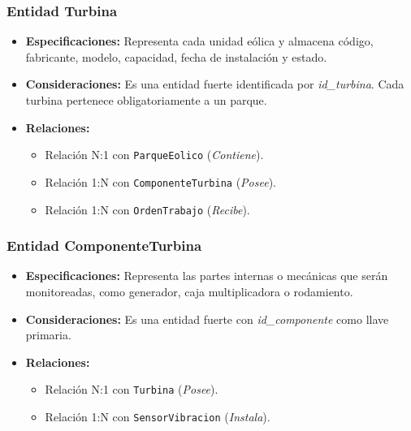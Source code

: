 \documentclass[11pt,a4paper]{article}
\begin{document}
\subsubsection{Entidad Turbina}
\begin{itemize}
    \item \textbf{Especificaciones:} Representa cada unidad eólica y almacena código,
    fabricante, modelo, capacidad, fecha de instalación y estado.
    \item \textbf{Consideraciones:} Es una entidad fuerte identificada por
    \textit{id\_turbina}. Cada turbina pertenece obligatoriamente a un parque.
    \item \textbf{Relaciones:}
    \begin{itemize}
        \item Relación N:1 con \texttt{ParqueEolico} (\textit{Contiene}).
        \item Relación 1:N con \texttt{ComponenteTurbina} (\textit{Posee}).
        \item Relación 1:N con \texttt{OrdenTrabajo} (\textit{Recibe}).
    \end{itemize}
\end{itemize}

\subsubsection{Entidad ComponenteTurbina}
\begin{itemize}
    \item \textbf{Especificaciones:} Representa las partes internas o mecánicas que
    serán monitoreadas, como generador, caja multiplicadora o rodamiento.
    \item \textbf{Consideraciones:} Es una entidad fuerte con
    \textit{id\_componente} como llave primaria.
    \item \textbf{Relaciones:}
    \begin{itemize}
        \item Relación N:1 con \texttt{Turbina} (\textit{Posee}).
        \item Relación 1:N con \texttt{SensorVibracion} (\textit{Instala}).
    \end{itemize}
\end{itemize}
\end{document}
